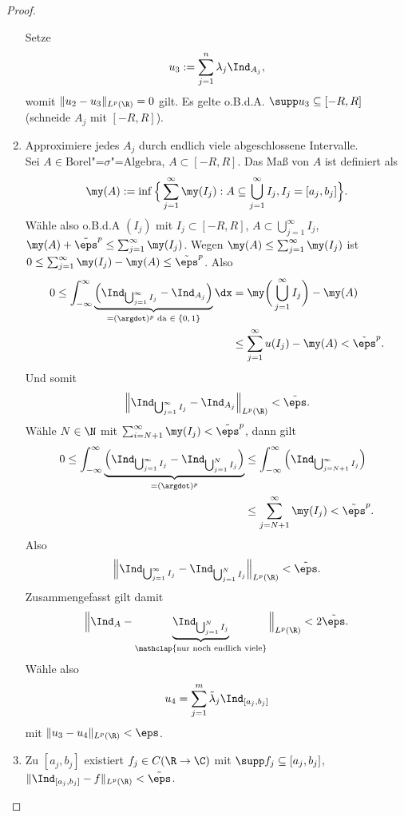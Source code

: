 \begin{st}
\begin{proof}
\begin{enumerate}[1)]
				Setze
				\[
					u_3 := \sum_{j=1}^n \lambda_j \Ind_{A_j},
				\]
				womit $\|u_2 - u_3\|_{L^p(\R)} = 0$ gilt.
				Es gelte o.B.d.A. $\supp u_3 \subset [-R,R]$ (schneide $A_j$ mit $[-R,R]$).
			\item
				Approximiere jedes $A_j$ durch endlich viele abgeschlossene Intervalle. \\
				Sei $A \in \text{Borel"=$\sigma$"=Algebra}$, $A \subset [-R,R]$.
				Das Maß von $A$ ist definiert als
				\[
					\my(A) := \inf \Big\{ \sum_{j=1}^\infty \my(I_j) : A \subset \bigcup_{j=1}^\infty I_j, I_j = [a_j, b_j] \Big\}.
				\]
				Wähle also o.B.d.A $(I_j)$ mit $I_j \subset [-R,R]$, $A \subset \bigcup_{j=1}^\infty I_j$, $\my(A) + \tilde \eps^p \le \sum_{j=1}^\infty \my(I_j)$.
				Wegen $\my(A) \le \sum_{j=1}^\infty \my(I_j)$ ist $0 \le \sum_{j=1}^\infty \my(I_j) - \my(A) \le \tilde \eps^p$.
				Also
				\begin{align*}
					0
					\le \int_{-\infty}^\infty \underbrace{\Big(\Ind_{\bigcup_{j=1}^\infty I_j} - \Ind_{A_j}\Big)}_{=(\argdot)^p \text{ da $\in \{0,1\}$}} \dx
					&= \my\bigg(\bigcup_{j=1}^\infty I_j \bigg) - \my(A) \\
					&\le \sum_{j=1}^\infty u(I_j) - \my(A)
					< \tilde \eps^p.
				\end{align*}
				Und somit
				\[
					\Big\|\Ind_{\bigcup_{j=1}^\infty I_j} - \Ind_{A_j}\Big\|_{L^p(\R)} < \tilde \eps.
				\]
				Wähle $N \in \N$ mit $\sum_{i=N+1}^\infty \my(I_j) < \tilde \eps^p$, dann gilt
				\begin{align*}
					0
					\le \int_{-\infty}^\infty \underbrace{\Big(\Ind_{\bigcup_{j=1}^\infty I_j} - \Ind_{\bigcup_{j=1}^N I_j}\Big)}_{=(\argdot)^p}
					&\le \int_{-\infty}^\infty \Big(\Ind_{\bigcup_{j=N+1}^\infty I_j}\Big) \\
					&\le \sum_{j=N+1}^\infty \my(I_j)
					< \tilde \eps^p.
				\end{align*}
				Also
				\[
					\Big\| \Ind_{\bigcup_{j=1}^\infty I_j} - \Ind_{\bigcup_{j=1}^N I_j} \Big\|_{L^p(\R)} < \tilde \eps.
				\]
				Zusammengefasst gilt damit
				\[
					\Big\| \Ind_A - \underbrace{\Ind_{\bigcup_{j=1}^N I_j}}_{\mathclap{\text{nur noch endlich viele}}} \Big\|_{L^p(\R)} < 2 \tilde \eps.
				\]
				Wähle also
				\[
					u_4 = \sum_{j=1}^m  \tilde \lambda_j \Ind_{[a_j,b_j]}
				\]
				mit $\|u_3 - u_4\|_{L^p(\R)} < \eps$.
			\item
				Zu $[a_j,b_j]$ existiert $f_j \in C(\R \to \C)$ mit $\supp f_j \subset [a_j, b_j]$, $\|\Ind_{[a_j,b_j]} - f\|_{L^p(\R)} < \tilde \eps$.


\end{enumerate}
\end{proof}
\end{st}
